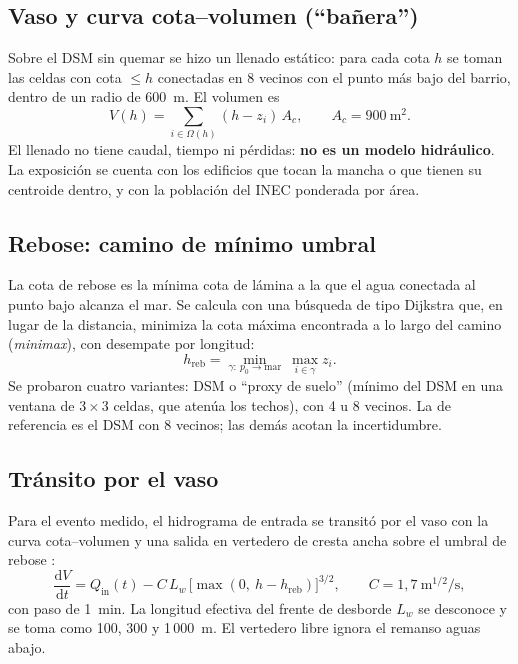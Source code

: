 \documentclass{sosg-informe}
\begin{document}
\subsection{Vaso y curva cota--volumen (\enquote{bañera})}
Sobre el DSM sin quemar se hizo un llenado estático: para cada cota $h$ se toman las celdas con cota $\leq h$ conectadas en 8 vecinos con el punto más bajo del barrio, dentro de un radio de 600~m. El volumen es
\begin{equation}
  V(h) = \sum_{i \in \Omega(h)} (h - z_i)\, A_c, \qquad A_c = 900~\mathrm{m}^2 .
\end{equation}
El llenado no tiene caudal, tiempo ni pérdidas: \textbf{no es un modelo hidráulico}. La exposición se cuenta con los edificios que tocan la mancha o que tienen su centroide dentro, y con la población del INEC ponderada por área.

\subsection{Rebose: camino de mínimo umbral}
La cota de rebose es la mínima cota de lámina a la que el agua conectada al punto bajo alcanza el mar. Se calcula con una búsqueda de tipo Dijkstra \citep{dijkstra1959} que, en lugar de la distancia, minimiza la cota máxima encontrada a lo largo del camino (\emph{minimax}), con desempate por longitud:
\begin{equation}
  h_{\mathrm{reb}} = \min_{\gamma:\ p_0 \to \text{mar}}\ \max_{i \in \gamma} z_i .
\end{equation}
Se probaron cuatro variantes: DSM o \enquote{proxy de suelo} (mínimo del DSM en una ventana de $3 \times 3$ celdas, que atenúa los techos), con 4 u 8 vecinos. La de referencia es el DSM con 8 vecinos; las demás acotan la incertidumbre.

\subsection{Tránsito por el vaso}
Para el evento medido, el hidrograma de entrada se transitó por el vaso con la curva cota--volumen y una salida en vertedero de cresta ancha sobre el umbral de rebose \citep{chow1959}:
\begin{equation}
  \frac{\mathrm{d}V}{\mathrm{d}t} = Q_{\mathrm{in}}(t) - C\, L_w \,\bigl[\max(0,\ h - h_{\mathrm{reb}})\bigr]^{3/2}, \qquad C = 1,7~\mathrm{m^{1/2}/s},
  \label{eq:vertedero}
\end{equation}
con paso de 1~min. La longitud efectiva del frente de desborde $L_w$ se desconoce y se toma como 100, 300 y 1\,000~m. El vertedero libre ignora el remanso aguas abajo.
\end{document}
